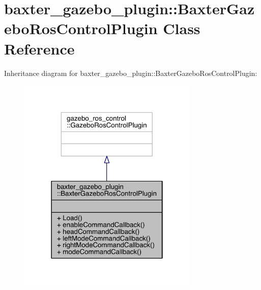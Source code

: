 \hypertarget{classbaxter__gazebo__plugin_1_1_baxter_gazebo_ros_control_plugin}{}\section{baxter\+\_\+gazebo\+\_\+plugin\+:\+:Baxter\+Gazebo\+Ros\+Control\+Plugin Class Reference}
\label{classbaxter__gazebo__plugin_1_1_baxter_gazebo_ros_control_plugin}


Inheritance diagram for baxter\+\_\+gazebo\+\_\+plugin\+:\+:Baxter\+Gazebo\+Ros\+Control\+Plugin\+:
\nopagebreak
\begin{figure}[H]
\begin{center}
\leavevmode
\includegraphics[width=243pt]{classbaxter__gazebo__plugin_1_1_baxter_gazebo_ros_control_plugin__inherit__graph}
\end{center}
\end{figure}


